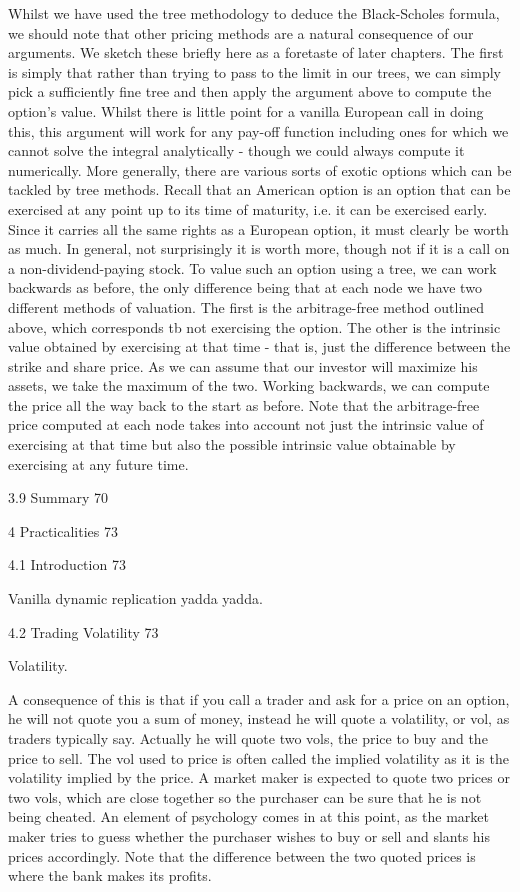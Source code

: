 Whilst we have used the tree methodology to deduce the Black-Scholes formula, we should note that other pricing methods are a natural consequence of our arguments. We sketch these briefly here as a foretaste of later chapters. The first is simply that rather than trying to pass to the limit in our trees, we can simply pick a sufficiently fine tree and then apply the argument above to compute the option's value. Whilst there is little point for a vanilla European call in doing this, this argument will work for any pay-off function including ones for which we cannot solve the integral analytically - though we could always compute it numerically. More generally, there are various sorts of exotic options which can be tackled by tree methods. Recall that an American option is an option that can be exercised at any point up to its time of maturity, i.e. it can be exercised early. Since it carries all the same rights as a European option, it must clearly be worth as much. In general, not surprisingly it is worth more, though not if it is a call on a non-dividend-paying stock. To value such an option using a tree, we can work backwards as before, the only difference being that at each node we have two different methods of valuation. The first is the arbitrage-free method outlined above, which corresponds tb not  exercising the option. The other is the intrinsic value obtained by exercising at that time - that is, just the difference between the strike and share price. As we can assume that our investor will maximize his assets, we take the maximum of the two. Working backwards, we can compute the price all the way back to the start as before. Note that the arbitrage-free price computed at each node takes into account not just the intrinsic value of exercising at that time but also the possible intrinsic value obtainable by exercising at any future time.

3.9 Summary 70



4 Practicalities 73



4.1 Introduction 73

Vanilla dynamic replication yadda yadda.

4.2 Trading Volatility 73

Volatility.

A consequence of this is that if you call a trader and ask for a price on an option, he will not quote you a sum of money, instead he will quote a volatility, or vol, as traders typically say. Actually he will quote two vols, the price to buy and the price to sell. The vol used to price is often called the implied volatility as it is the volatility implied by the price. A market maker is expected to quote two prices or two vols, which are close together so the purchaser can be sure that he is not being cheated. An element of psychology comes in at this point, as the market maker tries to guess whether the purchaser wishes to buy or sell and slants his prices accordingly. Note that the difference between the two quoted prices is where the bank makes its profits. 

